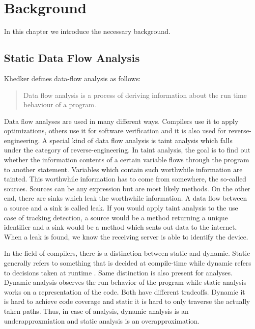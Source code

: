 \documentclass[../draft.tex]{subfiles}
\begin{document}
    \chapter{Background}
    In this chapter we introduce the necessary background.

    \section{Static Data Flow Analysis}

    Khedker \cite{Khedker2009} defines data-flow analysis as follows:
    \begin{quote}
        Data flow analysis is a process of deriving information about the run time behaviour of a program.
    \end{quote}
    Data flow analyses are used in many different ways. Compilers use it to apply optimizations, others use it for software verification and it is also used for reverse-engineering. A special kind of data flow analysis is taint analysis which falls under the category of reverse-engineering. In taint analysis, the goal is to find out whether the information contents of a certain variable flows through the program to another statement. Variables which contain such worthwhile information are tainted. This worthwhile information has to come from somewhere, the so-called sources. Sources can be any expression but are most likely methods. On the other end, there are sinks which leak the worthwhile information. A data flow between a source and a sink is called leak. If you would apply taint analysis to the use case of tracking detection, a source would be a method returning a unique identifier and a sink would be a method which sents out data to the internet. When a leak is found, we know the receiving server is able to identify the device.  
     
    In the field of compilers, there is a distinction between static and dynamic. Static generally refers to something that is decided at compile-time while dynamic refers to decisions taken at runtime \cite{Aho1986}. 
    Same distinction is also present for analyses. Dynamic analysis observes the run behavior of the program while static analysis works on a representation of the code. Both have different tradeoffs. Dynamic it is hard to achieve code coverage and static it is hard to only traverse the actually taken paths. Thus, in case of analysis, dynamic analysis is an underapproxmiation and static analysis is an overapproximation.  
\end{document}
